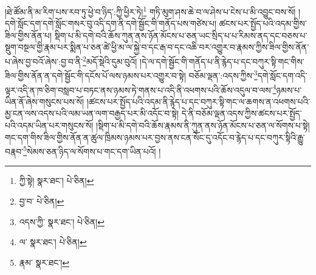 །ཐེ་ཚོམ་ནི་མ་རིག་པས་རབ་ཏུ་ཕྱེ་བ་ཉིད་:ཀྱི་ཕྱིར་ཏེ།\footnote{ཀྱི་སྟེ།  སྣར་ཐང་།  པེ་ཅིན། } གཏི་མུག་ཤས་ཆེ་བ་ལ་ཤེས་པ་ངེས་པ་མི་འབྱུང་བས་སོ། །དགེ་སློང་དག་དགེ་སློང་གསར་བུ་འདི་དག་ནི་དགེ་སྦྱོང་གི་གནོད་པས་གཙེས་པ། ཚངས་པར་སྤྱོད་པའི་འདམ་གྱིས་ཟིལ་གྱིས་ནོན་པ། སྡིག་པ་མི་དགེ་བའི་ཆོས་ཀུན་ནས་ཉོན་མོངས་པ་ཅན་ཡང་སྲིད་པ་པ་རིམས་ནད་དང་བཅས་པ་སྡུག་བསྔལ་གྱི་རྣམ་པར་སྨིན་པ་ཅན་ཚེ་ཕྱི་མ་ལ་སྐྱེ་བ་དང་རྒ་བ་དང་འཆི་བར་འགྱུར་བ་རྣམས་ཀྱིས་ཟིལ་གྱིས་ནོན་པ་ཞེས་བྱ་བའོ་ཞེས་:བྱ་བ་ནི་\footnote{བྱ་བ་  པེ་ཅིན། }མདོ་སྡེའི་དུམ་བུའོ། །དེ་ལ་དགེ་སྦྱོང་གི་གནོད་པ་ནི་རྙེད་པ་དང་བཀུར་སྟི་གང་གིས་ཟིལ་གྱིས་ནོན་ན་དགེ་སྦྱོང་གི་དངོས་པོ་ལས་ཉམས་པར་འགྱུར་བ་སྟེ། བཅོམ་ལྡན་:འདས་ཀྱིས་\footnote{འདས་ཀྱི་  སྣར་ཐང་།  པེ་ཅིན། }དགེ་སློང་དག་འདི་ལྟར་འདི་ན་ཁ་ཅིག་བསླབ་པ་བཏང་ནས་ཉམས་ཏེ་གནས་པ་འདི་ནི་འཕགས་པའི་ཆོས་འདུལ་བ་ལས་\footnote{ལ་  སྣར་ཐང་།  པེ་ཅིན། }ཉམས་པ་ཡིན་ནོ་ཞེས་གསུངས་པས་སོ། །ཚངས་པར་སྤྱོད་པའི་འདམ་ནི་རྙེད་པ་དང་བཀུར་སྟི་གང་ལ་ཆགས་ན་འཕགས་པའི་མྱ་ངན་ལས་འདས་པའི་ལམ་ཡན་ལག་བརྒྱད་པར་མི་འདོང་བ་སྟེ། དེ་ནི་བཅོམ་ལྡན་འདས་ཀྱིས་ཚངས་པར་སྤྱོད་པའི་འདམ་ཡིན་པར་གསུངས་སོ། །སྡིག་པ་མི་དགེ་བའི་ཆོས་རྣམས་ནི་ཀུན་ནས་ཉོན་མོངས་པ་ཅན་ལ་སོགས་པ་སྟེ། གང་དག་གིས་ཟིལ་གྱིས་ནོན་ན་ཚུལ་ཁྲིམས་ཉམས་པར་བྱས་ནས་ངན་སོང་དུ་འདོང་བ་རྙེད་པ་དང་བཀུར་སྟིའི་རྒྱུ་བརྣབ་\footnote{རྣམ་  སྣར་ཐང་། }སེམས་ཅན་ཉིད་ལ་སོགས་པ་གང་དག་ཡིན་པའོ། །
